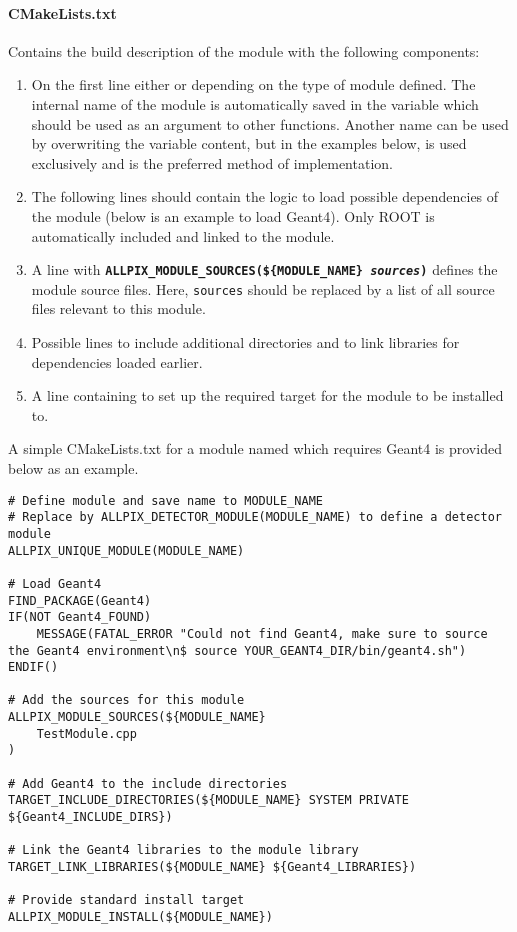 \paragraph{CMakeLists.txt}
Contains the build description of the module with the following components:
\begin{enumerate}
\item On the first line either  or  depending on the type of module defined.
The internal name of the module is automatically saved in the variable  which should be used as an argument to other functions.
Another name can be used by overwriting the variable content, but in the examples below,  is used exclusively and is the preferred method of implementation.
\item The following lines should contain the logic to load possible dependencies of the module (below is an example to load Geant4).
Only ROOT is automatically included and linked to the module.
\item A line with \texttt{\textbf{ALLPIX\_MODULE\_SOURCES(\$\{MODULE\_NAME\} \textit{sources})}} defines the module source files. Here, \texttt{sources} should be replaced by a list of all source files relevant to this module.
\item Possible lines to include additional directories and to link libraries for dependencies loaded earlier.
\item A line containing  to set up the required target for the module to be installed to.
\end{enumerate}

A simple CMakeLists.txt for a module named  which requires Geant4 is provided below as an example.
\vspace{5pt}

\begin{verbatim}
# Define module and save name to MODULE_NAME
# Replace by ALLPIX_DETECTOR_MODULE(MODULE_NAME) to define a detector module
ALLPIX_UNIQUE_MODULE(MODULE_NAME)

# Load Geant4
FIND_PACKAGE(Geant4)
IF(NOT Geant4_FOUND)
    MESSAGE(FATAL_ERROR "Could not find Geant4, make sure to source the Geant4 environment\n$ source YOUR_GEANT4_DIR/bin/geant4.sh")
ENDIF()

# Add the sources for this module
ALLPIX_MODULE_SOURCES(${MODULE_NAME}
    TestModule.cpp
)

# Add Geant4 to the include directories
TARGET_INCLUDE_DIRECTORIES(${MODULE_NAME} SYSTEM PRIVATE ${Geant4_INCLUDE_DIRS})

# Link the Geant4 libraries to the module library
TARGET_LINK_LIBRARIES(${MODULE_NAME} ${Geant4_LIBRARIES})

# Provide standard install target
ALLPIX_MODULE_INSTALL(${MODULE_NAME})
\end{verbatim}

